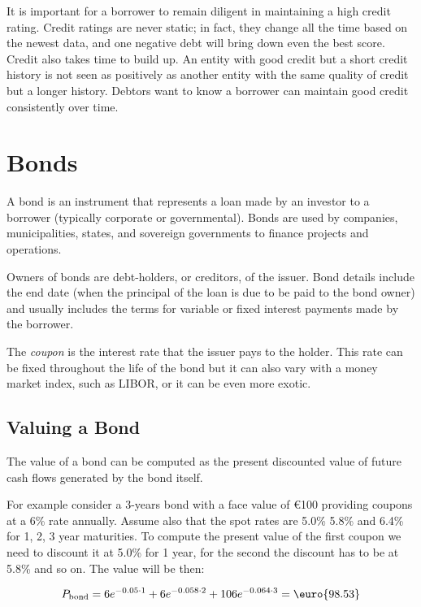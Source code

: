 It is important for a borrower to remain diligent in maintaining a high
credit rating. Credit ratings are never static; in fact, they change all
the time based on the newest data, and one negative debt will bring down
even the best score. 
Credit also takes time to build up. An entity with
good credit but a short credit history is not seen as positively as
another entity with the same quality of credit but a longer history.
Debtors want to know a borrower can maintain good credit consistently
over time.

\section{Bonds}\label{bonds}

A bond is an instrument that represents a loan made by an investor to a
borrower (typically corporate or governmental). Bonds are used by
companies, municipalities, states, and sovereign governments to finance
projects and operations. 

Owners of bonds are debt-holders, or creditors,
of the issuer. Bond details include the end date (when the principal of
the loan is due to be paid to the bond owner) and usually includes the
terms for variable or fixed interest payments made by the borrower.

The \emph{coupon} is the interest rate that the issuer pays to the holder.
This rate can be fixed throughout the life of the bond but it can also
vary with a money market index, such as LIBOR, or it can be even more
exotic.

\subsection{Valuing a Bond}\label{sec:bond_pricing}

The value of a bond can be computed as the present discounted value of
future cash flows generated by the bond itself.

For example consider a 3-years bond with a face value of \euro{100}
providing coupons at a 6\% rate annually. Assume also that the spot
rates are 5.0\% 5.8\% and 6.4\% for 1, 2, 3 year maturities. To
compute the present value of the first coupon we need to discount it at
5.0\% for 1 year, for the second the discount has to be at 5.8\% and so
on. The value will be then:

\[P_{\mathrm{bond}}=6e^{-0.05\cdot 1}+6e^{-0.058\cdot 2}+106e^{-0.064\cdot 3} = \textrm{\euro{98.53}}\]

